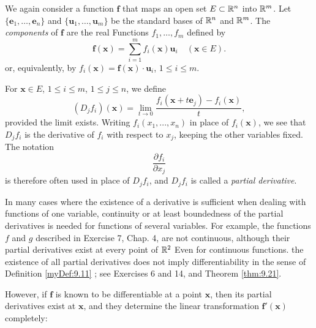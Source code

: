 
\begin{myDef}
    \label{myDef:9.16}
    We again consider a function $\mathbf{f}$ that maps an open set $E \subset {\protect\mathbb R}^n$ into ${\protect\mathbb R}^m$.
    Let $\{\mathbf{e}_1, \dots, \mathbf{e}_n\}$
    and $\{\mathbf{u}_1, \dots, \mathbf{u}_m\}$ 
    be the standard bases of ${\protect\mathbb R}^n$ and ${\protect\mathbb R}^m$.
    The \emph{components} of $\mathbf{f}$ are the real Functions
    $f_1, \dots, f_m$ defined by 
    \begin{equation}
        \label{eq:9.24}
        \mathbf{f(x)} = 
        \sum_{i=1}^{m} f_i(\mathbf{x}) \mathbf{u}_i
        \quad 
        (\mathbf{x} \in E).
    \end{equation}
    or, equivalently, by $f_i(\mathbf{x}) = \mathbf{f(x)}\cdot \mathbf{u}_i$, $1 \leq i \leq m$.

    For $\mathbf{x} \in E$, $1 \leq i \leq m$, $1 \leq j \leq n$, we define 
    \begin{equation}
        \label{eq:9.25}
        (D_j f_i)(\mathbf{x}) =
        \lim_{t \to 0} \frac{f_i(\mathbf{x} + t \mathbf{e}_j) - f_i (\mathbf{x})}{t},
    \end{equation}
    provided the limit exists.
    Writing $f_i(x_1 , ... , x_n)$ in place of $f_i(\mathbf{x})$, we see that $D_j f_i$ is the derivative of $f_i$ with respect to $x_j$, keeping the other variables fixed.
    The notation
    \begin{equation}
        \label{eq:9.26}
        \frac{\partial f_i}{\partial x_j}
    \end{equation}
    is therefore often used in place of $D_j f_i$, 
    and $D_j f_i$ is called a \emph{partial derivative}.
\end{myDef}

In many cases where the existence of a derivative is sufficient when dealing
with functions of one variable, continuity or at least boundedness of the partial derivatives is needed for functions of several variables. 
For example, the functions $f$ and $g$ described in Exercise 7, Chap. 4, are not continuous, although their partial derivatives exist at every point of ${\protect\mathbb R}^2$ Even for continuous functions.
the existence of all partial derivatives does not imply differentiability in the sense
of Definition \ref{myDef:9.11} ; see Exercises 6 and 14, and Theorem \ref{thm:9.21}.

However, if $\mathbf{f}$ is known to be differentiable at a point $\mathbf{x}$, then its partial derivatives exist at $\mathbf{x}$, and they determine the linear transformation $\mathbf{f'(x)}$ completely:

